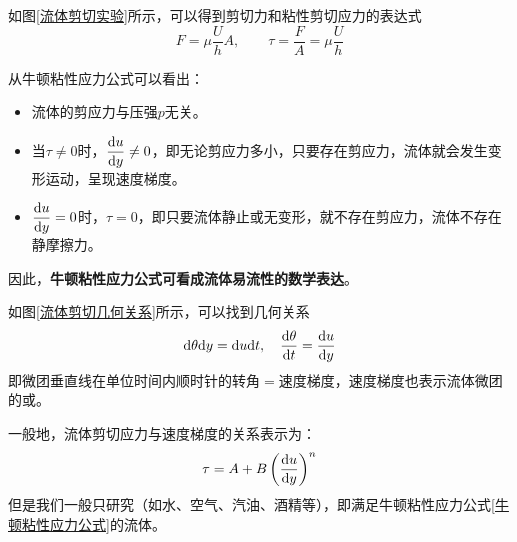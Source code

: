 如图\ref{流体剪切实验}所示，可以得到剪切力和粘性剪切应力的表达式
\begin{equation}
	F = \mu \dfrac{U}{h}A, \qquad \tau = \dfrac{F}{A} = \mu \dfrac{U}{h}
\end{equation}

\noindent 从牛顿粘性应力公式可以看出：\vspace*{-0.5em}
\begin{itemize}
	\item 流体的剪应力与压强$p$无关。\vspace*{-0.5em}
	\item 当$\tau \neq 0$时，$\dfrac{{\rm{d}} u}{{\rm{d}} y} \neq 0$，即无论剪应力多小，只要存在剪应力，流体就会发生变形运动，呈现速度梯度。\vspace*{-0.5em}
	\item $\dfrac{{\rm{d}} u}{{\rm{d}} y}=0$时，$\tau = 0$，即只要流体静止或无变形，就不存在剪应力，流体不存在静摩擦力。
\end{itemize}
因此，\textbf{牛顿粘性应力公式可看成流体易流性的数学表达}。

如图\ref{流体剪切几何关系}所示，可以找到几何关系
\begin{equation}
	{\rm{d}} \theta {\rm{d}} y = {\rm{d}} u {\rm{d}} t , \quad \dfrac{{\rm{d}} \theta }{{\rm{d}} t} = \dfrac{{\rm{d}} u}{{\rm{d}} y}
\end{equation}
即微团垂直线在单位时间内顺时针的转角$=$速度梯度，速度梯度也表示流体微团的或。

一般地，流体剪切应力与速度梯度的关系表示为：
\begin{equation}
	\tau = A + B \left(\dfrac{{\rm{d}} u}{{\rm{d}} y}\right)^n
\end{equation}
 但是我们一般只研究（如水、空气、汽油、酒精等），即满足牛顿粘性应力公式\eqref{牛顿粘性应力公式}的流体。
 
 
